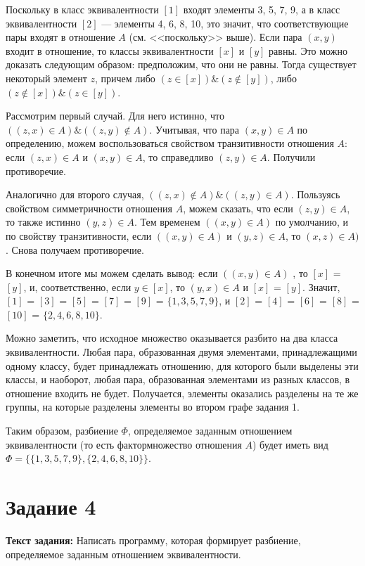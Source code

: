 \documentclass[12pt]{article}
\begin{document}
	Поскольку в класс эквивалентности $[1]$ входят элементы 3, 5, 7, 9,  а в класс эквивалентности $[2]$ --- элементы 4, 6, 8, 10, это значит, что соответствующие пары входят в отношение $A$ (см. <<поскольку>> выше). Если пара $(x, y)$ входит в отношение, то классы эквивалентности $[x]$ и $[y]$ равны. Это можно доказать следующим образом: предположим, что они не равны. Тогда существует некоторый элемент $z$, причем либо $(z \in [x]) \& (z \notin [y])$, либо $(z \notin [x]) \& (z\in [y])$. 
	
	Рассмотрим первый случай. Для него истинно, что $((z, x) \in A) \& ((z, y) \notin A)$. Учитывая, что пара $(x, y) \in A$ по определению, можем воспользоваться свойством транзитивности отношения $A$: если $(z, x) \in A$ и $(x, y) \in A$, то справедливо $(z, y) \in A$. Получили противоречие.
	
	Аналогично для второго случая, $((z, x) \notin A) \& ((z, y) \in A)$. Пользуясь свойством симметричности отношения $A$, можем сказать, что если $(z, y) \in A$, то также истинно $(y, z) \in A$. Тем временем $((x, y) \in A)$ по умолчанию, и по свойству транзитивности, если $((x, y) \in A)$ и $(y, z) \in A$, то $(x, z) \in A)$. Снова получаем противоречие.
	
	В конечном итоге мы можем сделать вывод: если $((x, y) \in A)$ , то $[x]$ = $[y]$, и, соответственно, если $y \in [x]$, то $(y, x) \in A$ и $[x]$ = $[y]$. Значит, $[1]$ = $[3]$ = $[5]$ = $[7]$ = $[9]$ = $\{1, 3, 5, 7, 9\}$, и $[2]$ = $[4]$ = $[6]$ = $[8]$ = $[10]$ = $\{2, 4, 6, 8, 10\}$.
	
	Можно заметить, что исходное множество оказывается разбито на два класса эквивалентности. Любая пара, образованная двумя элементами, принадлежащими одному классу, будет принадлежать отношению, для которого были выделены эти классы, и наоборот, любая пара, образованная элементами из разных классов, в отношение входить не будет. Получается, элементы оказались разделены на те же группы, на которые разделены элементы во втором графе задания 1. 
	
	Таким образом, разбиение $\Phi$, определяемое заданным отношением эквивалентности (то есть фактормножество отношения $A$) будет иметь вид $\Phi = \{\{1, 3, 5, 7, 9\}, \{2, 4, 6, 8, 10\} \}$.
	\section{Задание 4}
	\label{task4}

	{\bf Текст задания:} Написать программу, которая формирует разбиение, определяемое заданным отношением эквивалентности. 
	
\end{document}
